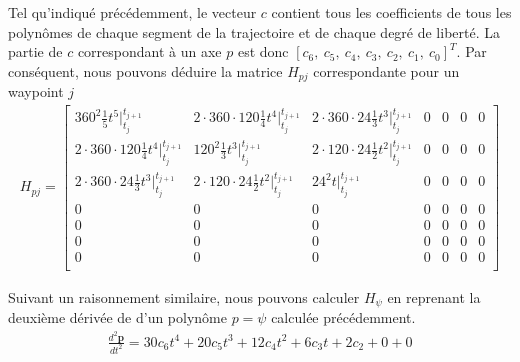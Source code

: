 \documentclass{article}
\begin{document}
Tel qu'indiqué précédemment, le vecteur $c$ contient tous les coefficients de tous les polynômes de chaque segment de la trajectoire et de chaque degré de liberté. La partie de $c$ correspondant à un axe $p$ est donc $[c_6,\ c_5,\ c_4,\ c_3,\ c_2,\ c_1,\ c_0]^T$. Par conséquent, nous pouvons déduire la matrice $H_{pj}$ correspondante pour un waypoint $j$
\begin{align}\label{eq:hessienne_p}
H_{pj} =
\begin{bmatrix}
    360^2 \frac{1}{5} t^5 \Big|_{t_j}^{t_{j+1}}
    		& 2 \cdot 360 \cdot 120 \frac{1}{4} t^4\Big|_{t_j}^{t_{j+1}}
    		& 2 \cdot 360 \cdot 24 \frac{1}{3} t^3\Big|_{t_j}^{t_{j+1}}
    		& 0
    		& 0
    		& 0
	    	& 0 \\
    2 \cdot 360 \cdot 120 \frac{1}{4} t^4\Big|_{t_j}^{t_{j+1}}
    		& 120^2 \frac{1}{3} t^3\Big|_{t_j}^{t_{j+1}} 
    		& 2 \cdot 120 \cdot 24 \frac{1}{2}t^2 \Big|_{t_j}^{t_{j+1}} & 0 & 0 & 0 & 0\\
	2 \cdot 360 \cdot 24 \frac{1}{3} t^3\Big|_{t_j}^{t_{j+1}}
		& 2 \cdot 120 \cdot 24 \frac{1}{2}t^2 \Big|_{t_j}^{t_{j+1}} 
		& 24^2 t\Big|_{t_j}^{t_{j+1}} & 0 & 0 & 0 & 0 \\
    0 & 0 & 0 & 0 & 0 & 0 & 0 \\
    0 & 0 & 0 & 0 & 0 & 0 & 0 \\
    0 & 0 & 0 & 0 & 0 & 0 & 0 \\
    0 & 0 & 0 & 0 & 0 & 0 & 0 \\
\end{bmatrix}
\end{align}

Suivant un raisonnement similaire, nous pouvons calculer $H_\psi$ en reprenant la deuxième dérivée de d'un polynôme $p = \psi$ calculée précédemment.
\begin{align*}
\frac{d^2 \boldsymbol{p}}{dt^2} = 
	30 c_6 t^4 + 20 c_5 t^3 + 12 c_4 t^2 + 6 c_3 t + 2c_2 + 0 + 0
\end{align*}
\end{document}
